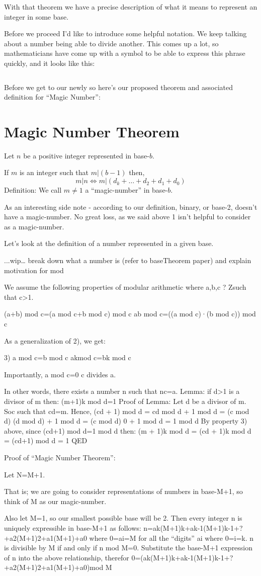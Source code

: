 \documentclass{article}
\newenvironment{jprIn}{\begin{adjustwidth}{2em}{}}{\end{adjustwidth}}
\begin{document}
\bigskip
With that theorem we have a precise description of what it means to represent an integer in some base.

Before we proceed I'd like to introduce some helpful notation.
 We keep talking about a number being
able to divide another. This comes up a lot, so mathematicians have come up with a symbol to be able to express
this phrase quickly, and it looks like this:

\[\]



Before we get to our newly so here's our
proposed theorem and associated definition for ``Magic Number'':

\section*{Magic Number Theorem}
\begin{jprIn}
Let $n$ be a positive integer represented in base-$b$.

If $m$ is an integer such that $m\big|(b-1)$ then,
\[m\big|n \Leftrightarrow m\big|(d_k+\dots+d_2+d_1+d_0)\]
Definition: We call $m\ne1$ a ``magic-number'' in base-$b$.
\end{jprIn}
\bigskip

As an interesting side note - according to our definition, binary,
or base-2, doesn't have a magic-number.
No great loss, as we said above 1 isn't helpful to consider as a magic-number. 

Let's look at the definition of a number represented in a given base.

...wip…
break down what a number is (refer to baseTheorem paper) and explain motivation for mod

We assume the following properties of modular arithmetic where a,b,c ? Zsuch that c>1.

(a+b) mod c=(a mod c+b mod c) mod c
ab mod c=((a mod c)·(b mod c)) mod c

As a generalization of 2), we get:

3) a mod c=b mod c akmod c=bk mod c

Importantly, a mod c=0 c divides a.

In other words, there exists a number n such that nc=a.
Lemma:
if d>1 is a divisor of m then:
(m+1)k mod d=1
Proof of Lemma:
Let d be a divisor of m. Soc such that cd=m.
Hence, (cd + 1) mod d = cd mod d + 1 mod d
= (c mod d) (d mod d) + 1 mod d
= (c mod d) 0 + 1 mod d
= 1 mod d
By property 3) above, since (cd+1) mod d=1 mod d then:
(m + 1)k mod d
= (cd + 1)k mod d
= (cd+1) mod d
= 1
QED

Proof of ``Magic Number Theorem'':

Let N=M+1.

That is; we are going to consider representations of numbers in base-M+1, so think of M as our magic-number.

Also let M=1, so our smallest possible base will be 2.
Then every integer n is uniquely expressible in base-M+1 as follows:
n=ak(M+1)k+ak-1(M+1)k-1+?+a2(M+1)2+a1(M+1)+a0
where 0=ai=M for all the ``digits'' ai where 0=i=k.
n is divisible by M if and only if n mod M=0. 
Substitute the base-M+1 expression of n into the above relationship, therefor
0=(ak(M+1)k+ak-1(M+1)k-1+?+a2(M+1)2+a1(M+1)+a0)mod M
\end{document}

